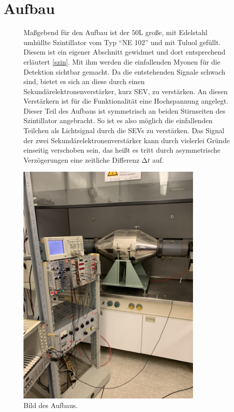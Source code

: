 
\section{Aufbau}
\begin{figure}
\begin{minipage}{0.49\textwidth}
Maßgebend für den Aufbau ist der $50 \si{\liter}$ große, mit Edelstahl umhüllte Szintillator vom Typ \enquote{NE 102} und mit Tuluol gefüllt. Diesem ist ein eigener Abschnitt gewidmet und dort entsprechend erläutert \ref{szin}. 
Mit ihm werden die einfallenden Myonen für die Detektion sichtbar gemacht. Da die entstehenden Signale schwach sind, bietet es sich an diese durch einen Sekundärelektronenverstärker, kurz SEV, zu verstärken. An diesen Verstärkern ist für
die Funktionalität eine Hochspannung angelegt. Dieser Teil des Aufbaus ist symmetrisch an beiden Stirnseiten des Szintillator angebracht. So ist es also möglich die einfallenden Teilchen als Lichtsignal durch die SEVs zu verstärken.
Das Signal der zwei Sekundärelektronenverstärker kann durch vielerlei Gründe einseitig verschoben sein, das heißt es tritt durch asymmetrische Verzögerungen eine zeitliche Differenz $\increment t$ auf.
\end{minipage}%
\begin{minipage}[h]{0.49\textwidth}
    \centering
    \includegraphics[width=0.8\textwidth]{bilder/bild2.png}
    \caption{Bild des Aufbaus. 
            }
\end{minipage}
\end{figure}
